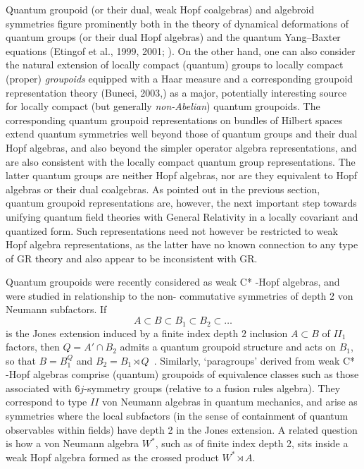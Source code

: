 \documentclass[12pt]{article}
\theoremstyle{plain}
\theoremstyle{definition}
\numberwithin{equation}{section}
\begin{document}
 Quantum groupoid (or their dual, weak Hopf coalgebras) and algebroid symmetries figure prominently both in the theory of dynamical deformations of quantum groups (or their dual Hopf algebras) and the quantum Yang--Baxter equations (Etingof et al., 1999, 2001; \cite{E99,E2k}). On the other hand, one can also consider the natural
extension of locally compact (quantum) groups to locally compact
(proper) \emph{groupoids} equipped with a Haar measure and a corresponding groupoid representation theory 
(Buneci, 2003,\cite{MB2k3}) as a major, potentially interesting source for locally compact (but
generally \emph{non-Abelian}) quantum groupoids. The corresponding quantum groupoid representations on bundles of
Hilbert spaces extend quantum symmetries well beyond those of quantum groups and their dual Hopf algebras, and also beyond the simpler operator algebra representations, and are also consistent with the locally compact quantum group representations. The latter quantum groups are neither Hopf algebras, nor are they equivalent to Hopf algebras or their dual coalgebras. As pointed out in the previous section, quantum groupoid representations are, however, the next important step towards unifying quantum field theories with General Relativity in a locally covariant and quantized form. Such representations need not however be restricted to weak Hopf algebra representations, as the latter have no known connection to any type of GR theory and also appear to be inconsistent with GR.

  Quantum groupoids were recently considered as weak C* -Hopf algebras, and were studied in relationship to the non- commutative symmetries of depth 2 von Neumann subfactors. If
\begin{equation}
A \subset B \subset B_1 \subset B_2 \subset \ldots
\end{equation}
is the Jones extension induced by a finite index depth $2$
inclusion $A \subset B$ of $II_1$ factors, then $Q= A' \cap B_2$
admits a quantum groupoid structure and acts on $B_1$, so that $B
= B_1^{Q}$ and $B_2 = B_1 \rtimes Q$~. Similarly, `paragroups' derived from weak C* -Hopf algebras comprise (quantum) groupoids of equivalence classes such as those associated with $6j$-symmetry groups (relative to a fusion rules algebra). They correspond to type $II$ von Neumann algebras in quantum mechanics, and arise as symmetries where the local subfactors (in the sense of containment of quantum observables within fields) have depth 2 in the
Jones extension. A related question is how a von Neumann algebra $W^*$, such as
of finite index depth 2, sits inside a weak Hopf algebra formed as the crossed product 
$W^* \rtimes A$.
\end{document}

